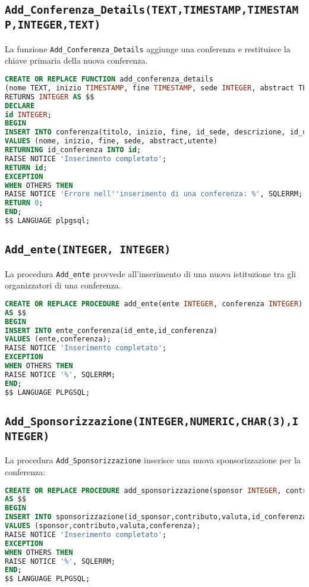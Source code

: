 \subsection{\texttt{Add\_Conferenza\_Details(TEXT,TIMESTAMP,TIMESTAMP,INTEGER,TEXT)}}
La funzione \texttt{Add\_Conferenza\_Details} aggiunge una conferenza e restituisce la chiave primaria della nuova conferenza.
\begin{lstlisting}[language=SQL,style=mystyle]
CREATE OR REPLACE FUNCTION add_conferenza_details
(nome TEXT, inizio TIMESTAMP, fine TIMESTAMP, sede INTEGER, abstract TEXT, utente INTEGER)
RETURNS INTEGER AS $$
DECLARE
id INTEGER;
BEGIN
INSERT INTO conferenza(titolo, inizio, fine, id_sede, descrizione, id_utente) 
VALUES (nome, inizio, fine, sede, abstract,utente)
RETURNING id_conferenza INTO id;
RAISE NOTICE 'Inserimento completato';
RETURN id;
EXCEPTION
WHEN OTHERS THEN
RAISE NOTICE 'Errore nell''inserimento di una conferenza: %', SQLERRM;
RETURN 0; 
END;
$$ LANGUAGE plpgsql;
\end{lstlisting}
\subsection{\texttt{Add\_ente(INTEGER, INTEGER)}}
La procedura \texttt{Add\_ente} provvede all'inserimento di una nuova istituzione tra gli organizzatori di una conferenza.
\begin{lstlisting}[language=SQL,style=mystyle]
CREATE OR REPLACE PROCEDURE add_ente(ente INTEGER, conferenza INTEGER)
AS $$
BEGIN
INSERT INTO ente_conferenza(id_ente,id_conferenza)
VALUES (ente,conferenza);
RAISE NOTICE 'Inserimento completato';
EXCEPTION
WHEN OTHERS THEN
RAISE NOTICE '%', SQLERRM;
END;
$$ LANGUAGE PLPGSQL;
\end{lstlisting}
\subsection{\texttt{Add\_Sponsorizzazione(INTEGER,NUMERIC,CHAR(3),INTEGER)}}
La procedura \texttt{Add\_Sponsorizzazione} inserisce una nuova sponsorizzazione per la conferenza:
\begin{lstlisting}[language=SQL, style=mystyle]
CREATE OR REPLACE PROCEDURE add_sponsorizzazione(sponsor INTEGER, contributo NUMERIC(1000,2), valuta CHAR(3), conferenza INTEGER)
AS $$
BEGIN
INSERT INTO sponsorizzazione(id_sponsor,contributo,valuta,id_conferenza)
VALUES (sponsor,contributo,valuta,conferenza);
RAISE NOTICE 'Inserimento completato';
EXCEPTION
WHEN OTHERS THEN
RAISE NOTICE '%', SQLERRM;
END;
$$ LANGUAGE PLPGSQL;
\end{lstlisting}
